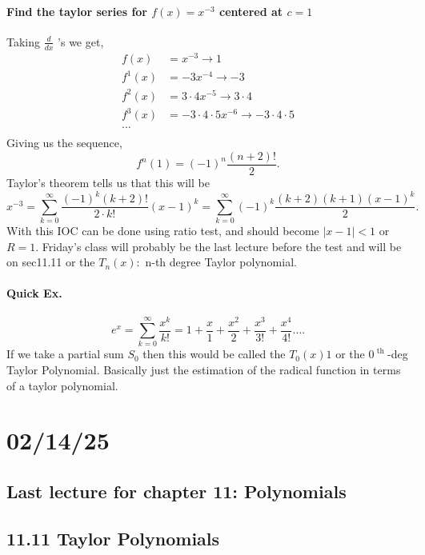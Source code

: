 \paragraph{Find the taylor series for $ f\left( x \right) =x^{ -3 } $ centered at $ c=1 $}
Taking $ \frac{ d }{ dx }  $ 's we get,
\begin{align*}
	f\left( x \right) &= x^{ -3 } \to 1\\
	f^{ 1 }\left( x \right) &= -3x^{ -4 } \to -3 \\
	f^{ 2 }\left( x \right) &= 3\cdot 4 x^{ -5 } \to 3\cdot 4\\
	f^{ 3 }\left( x \right) &= -3\cdot 4\cdot 5 x^{ -6 } \to -3\cdot 4\cdot 5\\
	\ldots \\
\end{align*}
Giving us the sequence,
\[
f^{ n }\left( 1 \right) =\left( -1 \right) ^{ n }\frac{ \left( n+2 \right) ! }{ 2 }
.\] 
Taylor's theorem tells us that this will be
\[
x^{ -3 }= \sum_{k=0}^{\infty} \frac{ \left( -1 \right) ^{ k }\left( k+2 \right) ! }{ 2\cdot k! }\left( x-1 \right) ^{ k } = \sum_{ k=0 } ^{ \infty } \left( -1 \right) ^{ k } \frac{ \left( k+2 \right) \left( k+1 \right) \left( x-1 \right) ^{ k } }{ 2 }
.\] 
With this IOC can be done using ratio test, and should become $ \left| x -1 \right| < 1 $ or $ R=1 $. 
Friday's class will probably be the last lecture before the test and will be on sec11.11 or the $ T_n\left( x \right) : $ n-th degree Taylor polynomial. 
\paragraph{Quick Ex.}
\[
e^{ x }=\sum_{ k=0 } ^{ \infty } \frac{ x^{ k } }{ k! }= 1 + \frac{ x }{ 1 } +\frac{ x^2 }{ 2 } + \frac{ x^3 }{ 3! }+ \frac{ x^{ 4 } }{ 4! }\ldots
.\] 
If we take a partial sum $ S_0 $ then this would be called the $ T_0\left( x \right) 1 $ or the $ 0^{ \text{ th } } $-deg Taylor Polynomial. Basically just the estimation of the radical function in terms of a taylor polynomial. 
\section*{02/14/25}%
\label{sec:02/14/25}

\subsection*{Last lecture for chapter 11: Polynomials}%
\label{sub:Last lecture for chapter 11}
\subsection*{11.11 Taylor Polynomials}%
\label{sub:11.11 Taylor Polynomials}

